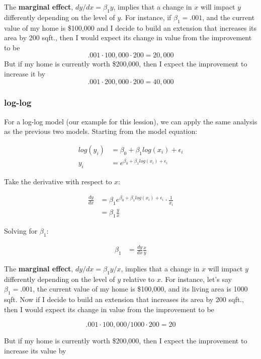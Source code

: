 \documentclass[10pt]{article}\usepackage[]{graphicx}\usepackage[]{color}
\begin{document}
The \textbf{marginal effect}, $dy / dx = \beta_1 y$, implies that a change in $x$ will impact $y$ differently depending on the level of $y$. For instance, if $\beta_1 = .001$, and the current value of my home is \$100,000 and I decide to build an extension that increases its area by 200 sqft., then I would expect its change in value from the improvement to be $$.001 \cdot 100,000 \cdot 200 = 20,000$$ But if my home is currently worth \$200,000, then I expect the improvement to increase it by $$.001 \cdot 200,000 \cdot 200 = 40,000$$

\subsubsection*{log-log}

For a log-log model (our example for this lession), we can apply the same analysis as the previous two models. Starting from the model equation:

\begin{align}
log(y_i) &=  \beta_0 + \beta_1 log(x_i) + \epsilon_i \\
y_i &= e^{\beta_0 + \beta_1 log(x_i) + \epsilon_i}
\end{align}

Take the derivative with respect to $x$:

\begin{align}
\frac{dy}{dx} &= \beta_1 e^{\beta_0 + \beta_1 log(x_i) + \epsilon_i} \cdot \frac{1}{x_i} \\
 &= \beta_1 \frac{y}{x} 
\end{align}

Solving for $\beta_1$:

\begin{align}
 \beta_1 &= \frac{dy}{dx} \frac{x}{y}
\end{align}

The \textbf{marginal effect}, $dy / dx = \beta_1 y / x$, implies that a change in $x$ will impact $y$ differently depending on the level of $y$ relative to $x$. For instance, let's say $\beta_1 = .001$, the current value of my home is \$100,000, and its living area is 1000 sqft. Now if I decide to build an extension that increases its area by 200 sqft., then I would expect its change in value from the improvement to be 

$$.001 \cdot 100,000 / 1000 \cdot 200 = 20$$ 

But if my home is currently worth \$200,000, then I expect the improvement to increase its value by 
\end{document}
